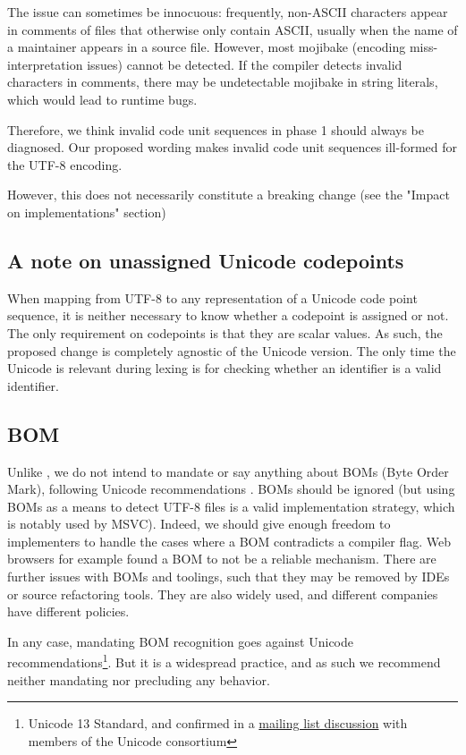 \documentclass{wg21}
\begin{document}
The issue can sometimes be innocuous:
frequently, non-ASCII characters appear in comments of files that otherwise only contain ASCII, usually when the name of
a maintainer appears in a source file.
However, most mojibake (encoding miss-interpretation issues) cannot be detected. If the compiler detects invalid characters in comments, there may be undetectable
mojibake in string literals, which would lead to runtime bugs.

Therefore, we think invalid code unit sequences in phase 1 should always be diagnosed.
Our proposed wording makes invalid code unit sequences ill-formed for the UTF-8 encoding.

However, this does not necessarily constitute a breaking change (see the "Impact on implementations" section)

\subsection{A note on unassigned Unicode codepoints}

When mapping from UTF-8 to any representation of a Unicode code point sequence, it is neither necessary to know
whether a codepoint is assigned or not.
The only requirement on codepoints is that they are scalar values.
As such, the proposed change is completely agnostic of the Unicode version.
The only time the Unicode is relevant during lexing is for checking whether an identifier is a valid identifier.

\subsection{BOM}

Unlike , we do not intend to mandate or say anything about BOMs (Byte Order Mark), following Unicode recommendations \cite{BOM}.
BOMs should be ignored (but using BOMs as a means to detect UTF-8 files is a valid implementation strategy, which is notably used by MSVC).
Indeed, we should give enough freedom to implementers to handle the cases where a BOM contradicts a compiler flag.
Web browsers for example found a BOM to not be a reliable mechanism.
There are further issues with BOMs and toolings, such that they may be removed by IDEs or source refactoring tools.
They are also widely used, and different companies have different policies.

In any case, mandating BOM recognition goes against Unicode recommendations\footnote{Unicode 13 Standard, and confirmed in a \href{https://corp.unicode.org/mailman/private/unicode/2020-June/008716.html}{mailing list discussion} with members of the Unicode consortium}. But it is a widespread practice, and as such we recommend neither mandating nor precluding any behavior.
\end{document}
